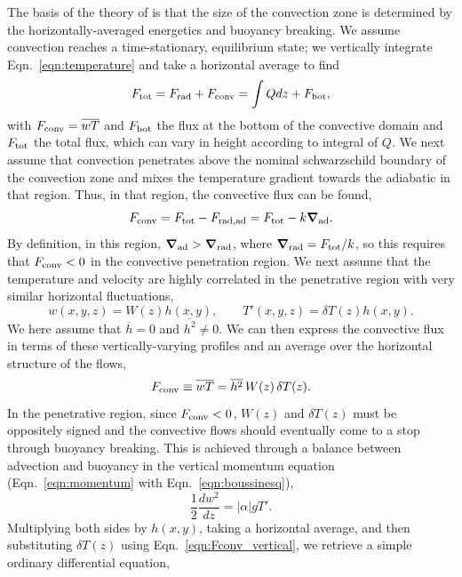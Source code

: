 \documentclass{aastex631}
\newcommand{\Fbot}{\ensuremath{F_{\rm{bot}}}}
\newcommand{\Ftot}{\ensuremath{F_{\rm{tot}}}}
\newcommand{\Frad}{\ensuremath{F_{\rm{rad}}}}
\newcommand{\Fconv}{\ensuremath{F_{\rm{conv}}}}
\renewcommand{\vec}[1]{\boldsymbol{#1}}
\newcommand{\grad}{\vec{\nabla}}
\begin{document}
The basis of the theory of \citet{zahn1991} is that the size of the convection zone is determined by the horizontally-averaged energetics and buoyancy breaking.
We assume convection reaches a time-stationary, equilibrium state; we vertically integrate Eqn.~\ref{eqn:temperature} and take a horizontal average to find
\begin{equation}
\Ftot = \Frad + \Fconv = \int Q dz + \Fbot,
\end{equation}
with $\Fconv = \overline{w T}$ and $\Fbot$ the flux at the bottom of the convective domain and $\Ftot$ the total flux, which can vary in height according to integral of $Q$.
We next assume that convection penetrates above the nominal schwarzschild boundary of the convection zone and mixes the temperature gradient towards the adiabatic in that region.
Thus, in that region, the convective flux can be found,
\begin{equation}
\Fconv = \Ftot - F_{\rm{rad, ad}} = \Ftot - k \grad_{\rm{ad}}.
\end{equation}
By definition, in this region, $\grad_{\rm{ad}} > \grad_{\rm{rad}}$, where $\grad_{\rm{rad}} = \Ftot/k$, so this requires that $\Fconv < 0$ in the convective penetration region.
We next assume that the temperature and velocity are highly correlated in the penetrative region with very similar horizontal fluctuations,
\begin{equation}
w(x,y,z) = W(z)h(x,y),
\qquad
T'(x,y,z) = \delta T(z)h(x,y).
\end{equation}
We here assume that $\overline{h} = 0$ and $\overline{h^2} \neq 0$.
We can then express the convective flux in terms of these vertically-varying profiles and an average over the horizontal structure of the flows,
\begin{equation}
\Fconv \equiv \overline{w T} = \overline{h^2} \, W(z) \, \delta T(z).
\label{eqn:Fconv_vertical}
\end{equation}
In the penetrative region, since $\Fconv < 0$, $W(z)$ and $\delta T(z)$ must be oppositely signed and the convective flows should eventually come to a stop through buoyancy breaking.
This is achieved through a balance between advection and buoyancy in the vertical momentum equation (Eqn.~\ref{eqn:momentum} with Eqn.~\ref{eqn:boussinesq}), 
\begin{equation}
\frac{1}{2}\frac{d w^2}{dz} = |\alpha| g T'.
\end{equation}
Multiplying both sides by $h(x,y)$, taking a horizontal average, and then substituting $\delta T(z)$ using Eqn.~\ref{eqn:Fconv_vertical}, we retrieve a simple ordinary differential equation,
\end{document}
